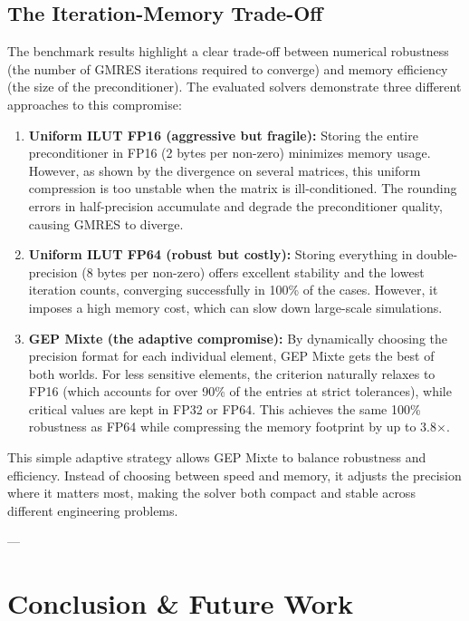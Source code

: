 \documentclass[11pt,a4paper]{article}
\begin{document}
\subsection{The Iteration-Memory Trade-Off}
\label{subsec:pareto}
The benchmark results highlight a clear trade-off between numerical robustness (the number of GMRES iterations required to converge) and memory efficiency (the size of the preconditioner). The evaluated solvers demonstrate three different approaches to this compromise:

\begin{enumerate}
    \item \textbf{Uniform ILUT FP16 (aggressive but fragile):} Storing the entire preconditioner in FP16 (2 bytes per non-zero) minimizes memory usage. However, as shown by the divergence on several matrices, this uniform compression is too unstable when the matrix is ill-conditioned. The rounding errors in half-precision accumulate and degrade the preconditioner quality, causing GMRES to diverge.

    \item \textbf{Uniform ILUT FP64 (robust but costly):} Storing everything in double-precision (8 bytes per non-zero) offers excellent stability and the lowest iteration counts, converging successfully in 100\% of the cases. However, it imposes a high memory cost, which can slow down large-scale simulations.

    \item \textbf{GEP Mixte (the adaptive compromise):} By dynamically choosing the precision format for each individual element, GEP Mixte gets the best of both worlds. For less sensitive elements, the criterion naturally relaxes to FP16 (which accounts for over 90\% of the entries at strict tolerances), while critical values are kept in FP32 or FP64. This achieves the same 100\% robustness as FP64 while compressing the memory footprint by up to 3.8$\times$.
\end{enumerate}

This simple adaptive strategy allows GEP Mixte to balance robustness and efficiency. Instead of choosing between speed and memory, it adjusts the precision where it matters most, making the solver both compact and stable across different engineering problems.



---

\section{Conclusion \& Future Work}
\end{document}
